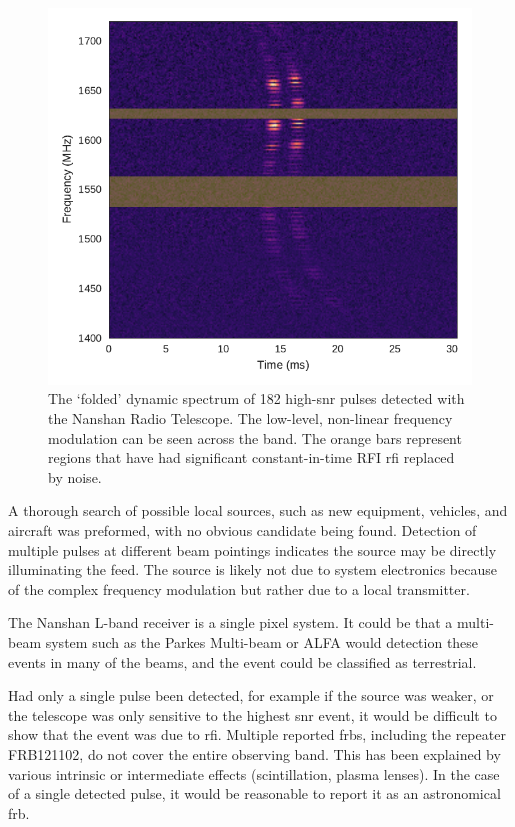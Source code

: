\documentclass[a4paper,fleqn,usenatbib]{mnras}
\begin{document}
\begin{figure}
    \includegraphics[width=1.0\linewidth]{figures/XAO_summed_dynamic.pdf}
    \caption{The `folded' dynamic spectrum of 182 high-\gls{snr} pulses detected
    with the Nanshan Radio Telescope.  The low-level, non-linear frequency
    modulation can be seen across the band. The orange bars represent regions
    that have had significant constant-in-time RFI \gls{rfi} replaced by noise.
    }
    \label{fig:xao_summed}
\end{figure}

A thorough search of possible local sources, such as new equipment, vehicles,
and aircraft was preformed, with no obvious candidate being found. Detection of
multiple pulses at different beam pointings indicates the source may be directly
illuminating the feed. The source is likely not due to system electronics
because of the complex frequency modulation but rather due to a local
transmitter.

The Nanshan L-band receiver is a single pixel system. It could be
that a multi-beam system such as the Parkes Multi-beam or ALFA would detection
these events in many of the beams, and the event could be classified as
terrestrial.

Had only a single pulse been detected, for example if the source was weaker, or
the telescope was only sensitive to the highest \gls{snr} event, it would be
difficult to show that the event was due to \gls{rfi}.  Multiple reported
\glspl{frb}, including the repeater FRB121102, do not cover the entire observing
band. This has been explained by various intrinsic or intermediate effects
(scintillation, plasma lenses). In the case of a single detected pulse, it would
be reasonable to report it as an astronomical \gls{frb}.
\end{document}
